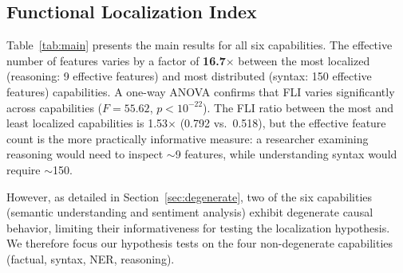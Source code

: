 \documentclass{article}
\begin{document}
\subsection{Functional Localization Index}

Table~\ref{tab:main} presents the main results for all six capabilities. The effective number of features varies by a factor of \textbf{16.7$\times$} between the most localized (reasoning: 9 effective features) and most distributed (syntax: 150 effective features) capabilities. A one-way ANOVA confirms that FLI varies significantly across capabilities ($F = 55.62$, $p < 10^{-22}$). The FLI ratio between the most and least localized capabilities is 1.53$\times$ (0.792 vs.\ 0.518), but the effective feature count is the more practically informative measure: a researcher examining reasoning would need to inspect $\sim$9 features, while understanding syntax would require $\sim$150.

However, as detailed in Section~\ref{sec:degenerate}, two of the six capabilities (semantic understanding and sentiment analysis) exhibit degenerate causal behavior, limiting their informativeness for testing the localization hypothesis. We therefore focus our hypothesis tests on the four non-degenerate capabilities (factual, syntax, NER, reasoning).
\end{document}
